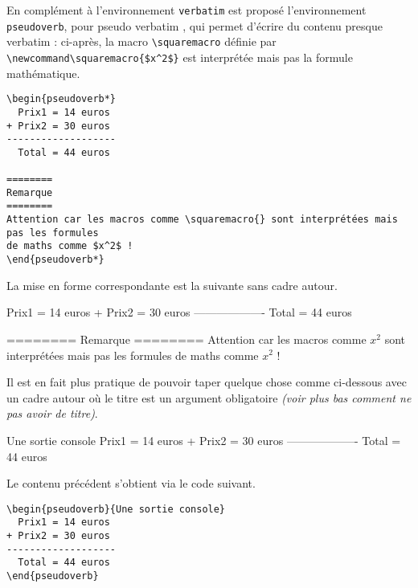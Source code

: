 \documentclass[12pt,a4paper]{article}
\theoremstyle{definition}
\newenvironment{frame-gene}[1][]{
	\begin{tcolorbox}[
		title        = #1, 
		colbacktitle = black!10!white, 
		colback      = white, 
		coltitle     = black,
		fonttitle    = \bfseries\itshape\small, 
		breakable,
		center title]
}{
	\end{tcolorbox}
}
\newcommand\squaremacro{$x^2$}
\begin{document}
En complément à l'environnement \verb+verbatim+ est proposé l'environnement \verb+pseudoverb+, pour \og pseudo verbatim \fg, qui permet d'écrire du contenu presque verbatim : ci-après, la macro \verb+\squaremacro+ définie par \verb+\newcommand\squaremacro{$x^2$}+ est interprétée mais pas la formule mathématique. 

\begin{frame-gene}
	\small
	\begin{verbatim}
\begin{pseudoverb*}
  Prix1 = 14 euros 
+ Prix2 = 30 euros
-------------------
  Total = 44 euros

========
Remarque
========
Attention car les macros comme \squaremacro{} sont interprétées mais pas les formules
de maths comme $x^2$ !
\end{pseudoverb*} 
	\end{verbatim}
\end{frame-gene}


La mise en forme correspondante est la suivante sans cadre autour.

\begin{frame-gene}
	\begin{pseudoverb*}
  Prix1 = 14 euros
+ Prix2 = 30 euros
-------------------
  Total = 44 euros

========
Remarque
========
Attention car les macros comme \squaremacro{} sont interprétées mais pas les formules
de maths comme $x^2$ !
	\end{pseudoverb*} 
\end{frame-gene}


\medskip


Il est en fait plus pratique de pouvoir taper quelque chose comme ci-dessous avec un cadre autour où le titre est un argument obligatoire \emph{(voir plus bas comment ne pas avoir de titre)}.

\begin{pseudoverb}{Une sortie console}
  Prix1 = 14 euros
+ Prix2 = 30 euros
-------------------
  Total = 44 euros
\end{pseudoverb} 


Le contenu précédent s'obtient via le code suivant.

\begin{frame-gene}
	\small
	\begin{verbatim}
\begin{pseudoverb}{Une sortie console}
  Prix1 = 14 euros
+ Prix2 = 30 euros
-------------------
  Total = 44 euros
\end{pseudoverb} 
	\end{verbatim} 
\end{frame-gene}
\end{document}
